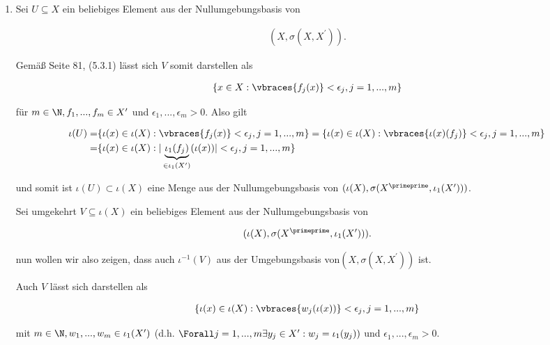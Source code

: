 \begin{solution}

\phantom{}

\begin{enumerate}[label = (\arabic*)]

  \item

  Sei $U \subseteq X$ ein beliebiges Element aus der Nullumgebungsbasis von

  \begin{align*}
    (X,\sigma(X,X^{\prime})).
  \end{align*}

  Gemäß Seite 81, (5.3.1) lässt sich $V$ somit darstellen als

  \begin{align*}
    \{x \in X: \vbraces{f_{j}(x)}<\epsilon_j, j=1,...,m\}
  \end{align*}

  für $m \in \N,f_1,...,f_m \in X^{\prime}$ und $\epsilon_1,...,\epsilon_m > 0$.
  Also gilt

  \begin{align*}
    \iota(U) =& \{\iota(x) \in \iota(X): \vbraces{f_{j}(x)}<\epsilon_j, j=1,...,m\} = \{\iota(x) \in \iota(X): \vbraces{\iota(x)(f_{j})}<\epsilon_j, j=1,...,m\} \\
    =& \{\iota(x) \in \iota(X): |\underbrace{\iota_1 (f_{j})}_{\in \iota_1 (X^{\prime})}(\iota(x))|<\epsilon_j, j=1,...,m\}
  \end{align*}

  und somit ist $\iota(U) \subset \iota(X)$ eine Menge aus der Nullumgebungsbasis von $(\iota(X),\sigma(X^{\primeprime},\iota_1(X^{\prime})))$.

  Sei umgekehrt $V \subseteq \iota(X)$ ein beliebiges Element aus der Nullumgebungsbasis von

  \begin{align*}
    (\iota(X),\sigma(X^{\primeprime},\iota_1(X^{\prime}))).
  \end{align*}

  nun wollen wir also zeigen, dass auch $\iota^{-1}(V)$ aus der Umgebungsbasis von$(X,\sigma(X,X^{\prime}))$ ist.

  Auch $V$ lässt sich darstellen als

  \begin{align*}
    \{\iota(x) \in \iota(X): \vbraces{w_{j}(\iota(x))}<\epsilon_j, j=1,...,m\}
  \end{align*}

  mit $m \in \N,w_1,...,w_m \in \iota_1(X^{\prime})$ (d.h. $\Forall j = 1,...,m \exists y_j \in X^{\prime} : w_j = \iota_1(y_j))$ und $\epsilon_1,...,\epsilon_m > 0$.


\end{enumerate}
\end{solution}
